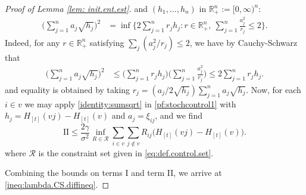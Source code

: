 \documentclass[11pt,reqno]{amsart}
\numberwithin{equation}{section}
\theoremstyle{definition}
\def\CC{{C}}
\def\A{{\mathcal A}}
\def\E{{\mathbb E}}
\def\R{{\mathbb R}}
\begin{document}
\begin{proof}[Proof of Lemma \ref{lem: init.ent.est}]
	and $(h_1,\ldots,h_n)$ in $\R^n_+ := [0,\infty)^n$:
	\begin{align}
		\bigg(\sum_{j=1}^n a_j\sqrt{h_j}\bigg)^2
		&= \inf\bigg\{2 \sum_{j=1}^n r_j h_j
		: r \in \R^n_+, \ \sum_{j=1}^n \frac{a_j^2}{r_j} \le 2\bigg\}.
		\label{identity:sumsqrt}
	\end{align}
	Indeed, for any $r \in \R^n_+$ satisfying $\sum_j(a_j^2/r_j) \le 2$,
	we have by Cauchy-Schwarz that
	\begin{align*}
		\bigg(\sum_{j=1}^n a_j\sqrt{h_j}\bigg)^2
		&\le \bigg(\sum_{j=1}^n r_j h_j \bigg)
		\bigg(\sum_{j=1}^n \frac{a_j^2}{r_j}\bigg)
		\le 2 \sum_{j=1}^n r_j h_j .
	\end{align*}
		and equality is obtained by taking $r_j=(a_j /2\sqrt{h_j})\sum_{j=1}^na_j\sqrt{h_j}$. Now, for each $i \in v$ we may apply \eqref{identity:sumsqrt} in \eqref{pf:stochcontrol1} with $h_j= H_{[t]}(vj) - H_{[t]}(v)$ and $a_j=\xi_{ij}$, and we find
		\begin{equation*}
			\text{II} \leq \frac{2\gamma}{\sigma^2} \inf_{R \in \mathcal{R}}  \sum_{i \in v}  \sum_{j \notin v} R_{ij}\big(H_{[t]}(vj) - H_{[t]}(v) \big).
		\end{equation*}
 where $\mathcal{R}$ is the constraint set given in \eqref{eq:def.control.set}.
	
		
		Combining the bounds on terms I and term II, we arrive at \eqref{ineq:lambda.CS.diffineq}.
		

\end{proof}
\end{document}
